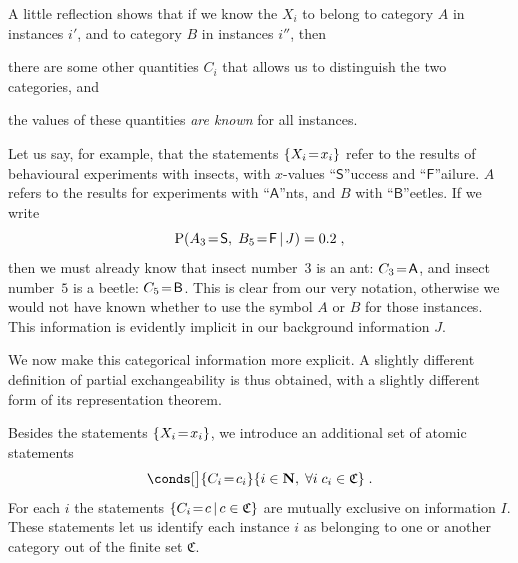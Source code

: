 \documentclass[\ifafour a4paper,12pt,\else a5paper,10pt,\fi%
onecolumn,oneside,article,%
british%
]{memoir}
\theoremstyle{remark}
\theoremstyle{innote}
\newcommand*{\NN}{\bm{\mathrm{N}}}
\DeclarePairedDelimiter\set{\{}{\}}
\newcommand*{\p}{\mathrm{P}}%
\renewcommand*{\|}[1][]{\nonscript\,#1\vert\nonscript\,\mathopen{}}
\renewcommand*{\=}{\TextOrMath\texteq\eq}
\newcommand*{\X}[1]{X_{#1}}
\newcommand*{\x}[1]{x_{#1}}
\newcommand*{\A}[1]{A_{#1}}
\newcommand*{\B}[1]{B_{#1}}
\newcommand*{\C}[1]{C_{#1}}
\newcommand*{\cc}[1]{c_{#1}}
\newcommand*{\sC}{\mathfrak{C}}
\newcommand*{\xs}{\textsf{S}}
\newcommand*{\xf}{\textsf{F}}
\newcommand*{\xA}{\textsf{A}}
\newcommand*{\xB}{\textsf{B}}
\newcommand*{\zI}{J}
\begin{document}
A little reflection shows that if we know the $\X{i}$ to belong to category
$A$ in instances $i'$, and to category $B$ in instances $i''$, then
\begin{enumerate*}[label=(\roman*)]
\item there are some other quantities $\C{i}$ that allows us to distinguish
  the two categories, and \item the values %
  of these quantities \emph{are known} for all instances.
\end{enumerate*}

Let us say, for example, that the statements $\set{\X{i}\=\x{i}}$ refer to
the results of behavioural experiments with insects, with $x$-values
\enquote{$\xs$}uccess and \enquote{$\xf$}ailure. $A$ refers to the results
for experiments with \enquote{$\xA$}nts, and $B$ with
\enquote{$\xB$}eetles. If we write
$$\p(\A{3}\=\xs,\;\B{5}\=\xf \| \zI)=0.2\;,$$
then we must already know that insect number~$3$ is an ant: $\C{3}\=\xA$,
and insect number~$5$ is a beetle: $\C{5}\=\xB$. This is clear from our
very notation, otherwise we would not have known whether to use the symbol
$A$ or $B$ for those instances. This information is evidently implicit in
our background information $\zI$.

We now make this categorical information more explicit. A slightly
different definition of partial exchangeability is thus obtained, with a
slightly different form of its representation theorem.



Besides the statements $\set{\X{i}\=\x{i}}$, we introduce an additional set
of atomic statements
\begin{equation}
  \label{eq:category_statements}
  \conds[\big]{\C{i}\=\cc{i}}{i \in \NN,\;
 \forall i\;\cc{i} \in \sC} \;.
\end{equation}
For each $i$ the statements $\set{\C{i}\=c \| c \in \sC}$ are mutually
exclusive on information $I$.
These statements let us identify each instance $i$ as belonging to one
or another category out of the finite set $\sC$.
\end{document}
